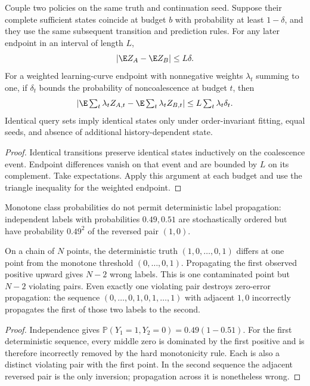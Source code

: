 \begin{proposition}
\label{rthreegeo:coupling}
Couple two policies on the same truth and continuation seed. Suppose
their complete sufficient states coincide at budget $b$ with probability
at least $1-\delta$, and they use the same subsequent transition and
prediction rules. For any later endpoint in an interval of length $L$,
\[
 |\E Z_A-\E Z_B|\le L\delta.
\]
For a weighted learning-curve endpoint with nonnegative weights
$\lambda_t$ summing to one, if $\delta_t$ bounds the probability of
noncoalescence at budget $t$, then
\[
 |\E\textstyle\sum_t\lambda_t Z_{A,t}
       -\E\sum_t\lambda_t Z_{B,t}|
 \le L\sum_t\lambda_t\delta_t.
\]
Identical query sets imply identical states only under order-invariant
fitting, equal seeds, and absence of additional history-dependent state.
\end{proposition}
\begin{proof}
Identical transitions preserve identical states inductively on the
coalescence event. Endpoint differences vanish on that event and are
bounded by $L$ on its complement. Take expectations.
Apply this argument at each budget and use the triangle inequality for
the weighted endpoint.
\end{proof}

\begin{counterexample}
\label{rthreegeo:monotone}
Monotone class probabilities do not permit deterministic label
propagation: independent labels with probabilities $0.49,0.51$ are
stochastically ordered but have probability $0.49^2$ of the reversed
pair $(1,0)$.

On a chain of $N$ points, the deterministic truth
$(1,0,\ldots,0,1)$ differs at one point from the monotone threshold
$(0,\ldots,0,1)$. Propagating the first observed positive upward gives
$N-2$ wrong labels. This is one contaminated point but $N-2$ violating
pairs. Even exactly one violating pair destroys zero-error propagation:
the sequence $(0,\ldots,0,1,0,1,\ldots,1)$ with adjacent $1,0$
incorrectly propagates the first of those two labels to the second.
\end{counterexample}
\begin{proof}
Independence gives $\mathbb P(Y_1=1,Y_2=0)=0.49(1-0.51)$.
For the first deterministic sequence, every middle zero is dominated
by the first positive and is therefore incorrectly removed by the
hard monotonicity rule. Each is also a distinct violating pair with
the first point. In the second sequence the adjacent reversed pair is
the only inversion; propagation across it is nonetheless wrong.
\end{proof}

